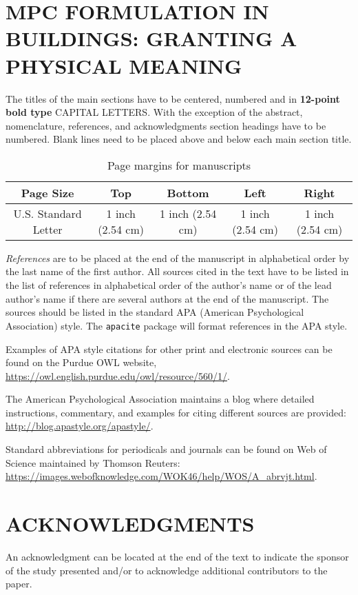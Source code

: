 \documentclass[10pt]{extarticle}
\begin{document}
\section{MPC FORMULATION IN BUILDINGS: GRANTING A PHYSICAL MEANING }

The titles of the main sections have to be centered, numbered and in \textbf{12-point bold type} CAPITAL LETTERS.  With the exception of the abstract, nomenclature, references, and acknowledgments section headings have to be numbered. Blank lines need to be placed above and below each main section title.

\begin{table}[b]
\centering
\caption{Page margins for manuscripts}
\begin{tabular}{ccccc}
\toprule
\textbf{Page Size} & \textbf{Top} & \textbf{Bottom} & \textbf{Left} & \textbf{Right} \\ 
\midrule 
U.S. Standard Letter & 1 inch (2.54 cm) & 1 inch (2.54 cm) & 1 inch (2.54 cm) & 1 inch (2.54 cm) \\ 
\bottomrule 
\end{tabular}
\end{table} 






\vspace{24pt}
\emph{References} are to be placed at the end of the manuscript in alphabetical order by the last name of the first author.  All sources cited in the text have to be listed in the list of references in alphabetical order of the author's name or of the lead author's name if there are several authors at the end of the manuscript.  The sources should be listed in the standard APA (American Psychological Association) style.  The \texttt{apacite} package will format references in the APA style. 

Examples of APA style citations for other print and electronic sources can be found on the Purdue OWL website, \url{https://owl.english.purdue.edu/owl/resource/560/1/}.

The American Psychological Association maintains a blog where detailed instructions, commentary, and examples for citing different sources are provided: \url{http://blog.apastyle.org/apastyle/}.

Standard abbreviations for periodicals and journals can be found on Web of Science maintained by Thomson Reuters: \url{https://images.webofknowledge.com/WOK46/help/WOS/A_abrvjt.html}.  

\section*{ACKNOWLEDGMENTS}

An acknowledgment can be located at the end of the text to indicate the sponsor of the study presented and/or to acknowledge additional contributors to the paper. 
\end{document}
